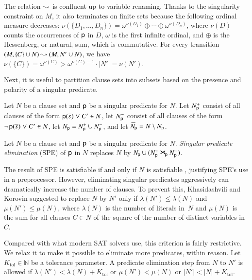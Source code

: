 \begin{conf}
The relation $\mathbin\leadsto$ is confluent up to variable renaming. Thanks to
the singularity constraint on $M$, it
also terminates on finite sets because the following ordinal measure decreases:
$\nu(\{D_1,\allowbreak\dotsc,\allowbreak D_n\}) = \omega^{\nu(D_1)} \oplus \cdots \oplus
\omega^{\nu(D_n)}$, where $\nu(D)$ counts the occurrences of $\mathsf{p}$ in
$D$, $\omega$ is the first infinite ordinal,
and $\oplus$ is the Hessenberg, or natural, sum, which is commutative.
For every transition
$(M, \{C\} \cup N) \mathbin\leadsto (M, N' \cup N)$, we have
$\nu(\{C\}) = \omega^{\nu(C)} > \omega^{\nu(C)-1} \cdot |N'| = \nu(N')$.
\end{conf}

Next, it is useful to partition
clause sets into subsets based on the presence and polarity of a singular
predicate.

\begin{defi}
   Let $N$ be a clause set and $\mathsf{p}$ be a singular predicate for
   $N.$ Let $N^+_{\mathsf{p}}$ consist of all clauses of the form ${\mathsf{p}(\overline{s}_{})} \mathrel{\lor} C' \in N$,
   let $N^-_{\mathsf{p}}$ consist of all clauses of the form $\neg{\kern.2ex \mathsf{p}(\overline{s}_{})} \mathrel{\lor} C' \in N$,
   let $N_{\mathsf{p}} = N^+_{\mathsf{p}} \cup N^-_{\mathsf{p}}$,
   and let $\,\overline{\!N}_{\!\mathsf{p}} = N \setminus N_{\mathsf{p}}$.
\end{defi}

\begin{defi}
   \label{def:pred-elim}
   Let $N$ be a clause set and $\mathsf{p}$ be a singular predicate for
   $N.$
   \emph{Singular predicate elimination} (SPE) of $\mathsf{p}$ in $N$ replaces $N$ by
   $\,\overline{\!N}_{\!\mathsf{p}} \cup (N^+_{\mathsf{p}} \mathbin{\smash{\hbox{\Large$\kern-.1ex\rtimes$}}}_{\!\mathsf{p}} N^-_{\mathsf{p}})$.
\end{defi}

The result of SPE is satisfiable if and only if $N$ is satisfiable
\cite[Theorem~1]{kk-2016-pe-fol}, justifying SPE's use in a preprocessor.
However, eliminating singular predicates aggressively can dramatically increase
the number of clauses. To prevent this, Khasidashvili and Korovin suggested to
replace $N$ by $N'$ only if $\lambda(N') \leq \lambda(N)$
and $\mu(N') \leq \mu(N)$, where
$\lambda(N)$ is the number of literals in~$N$ and
$\mu(N)$ is the sum for all clauses $C \in
N$ of the square of the number of distinct variables in $C$.

Compared with what modern SAT solvers use, this
criterion is fairly restrictive. We relax it to make it possible to
eliminate more predicates, within reason. Let $K_\mathrm{tol} \in \mathbb{N}$ be a tolerance
parameter. A predicate elimination
step from $N$ to $N'$ is allowed if
$\lambda(N') < \lambda(N) + K_\mathrm{tol}$ or
$\mu(N') < \mu(N)$ or
$|N'| < |N| + K_\mathrm{tol}$.


